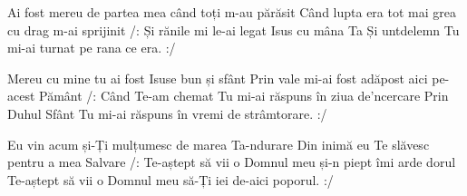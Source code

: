 
\beginverse
Ai fost mereu de partea mea când toți m-au părăsit
Când lupta era tot mai grea cu drag m-ai sprijinit
/: Și rănile mi le-ai legat Isus cu mâna Ta
Și untdelemn Tu mi-ai turnat pe rana ce era. :/
\endverse

\beginverse
Mereu cu mine tu ai fost Isuse bun și sfânt
Prin vale mi-ai fost adăpost aici pe-acest Pământ
/: Când Te-am chemat Tu mi-ai răspuns în ziua de'ncercare
Prin Duhul Sfânt Tu mi-ai răspuns în vremi de strâmtorare. :/
\endverse

\beginverse
Eu vin acum și-Ți mulțumesc de marea Ta-ndurare
Din inimă eu Te slăvesc pentru a mea Salvare
/: Te-aștept să vii o Domnul meu și-n piept îmi arde dorul
Te-aștept să vii o Domnul meu să-Ți iei de-aici poporul. :/
\endverse

\endsong